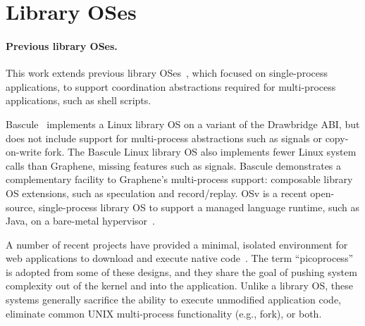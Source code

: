 \section{Library OSes}


\begin{comment}
Recent library OSes, including Graphene,
search for a better
division of labor between the host kernel and guests.
Paravirtualized VMs attempt to move away from modeling specific hardware designs in software
toward a more virtualization-friendly hardware model~\citep{barham03xen,whitaker02denali, eiraku09outsourcing}.
Library OSes can be viewed as extreme paravirtualization---attempting
to find the most ideal interface between guest and host. %
\end{comment}

\paragraph{Previous library OSes.}
This work extends previous library OSes~\citep{porter11drawbridge,xax,unikernels,baumann13bascule,osv},
which focused on single-process applications,
to support coordination abstractions required 
for multi-process applications, such as shell scripts.


Bascule~\citep{baumann13bascule} implements a Linux library OS on a variant of the Drawbridge ABI,
but does not include support for multi-process abstractions such as signals or copy-on-write fork.
The Bascule Linux library OS also implements fewer Linux system calls than Graphene, missing
features such as signals.
Bascule demonstrates a complementary facility to Graphene's multi-process support: composable library OS extensions, 
such as speculation and record/replay.
OSv is a recent open-source, %
single-process 
library OS to support a managed language runtime, such as Java, on a bare-metal hypervisor~\citep{osv}.


A number of recent projects have provided a minimal, isolated environment
for web applications to download and execute native code~\citep{nacl,xax,howell13refactoring,gazelle,atlantis}.
The term ``picoprocess'' is adopted from some of these designs, and they share 
the goal of pushing system complexity out of the kernel and into the application.
Unlike a library OS, these systems
generally sacrifice the ability to execute unmodified application code, 
eliminate common UNIX multi-process functionality (e.g., fork), or both.



